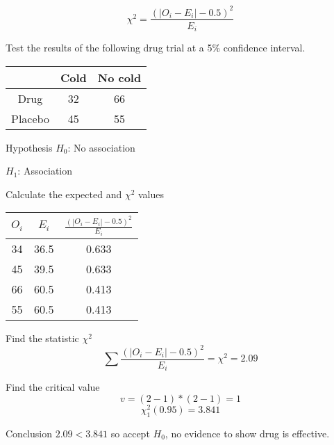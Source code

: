        $$
        \chi^2 = \frac{(|O_i - E_i| - 0.5)^2}{E_i}
        $$
    
        \begin{example}
        {
            Test the results of the following drug trial at a 5\% confidence interval.
            
            \begin{center}
            \begin{tabular}{c|c|c}
                        & Cold  & No cold   \\
                \hline
                Drug    & 32    & 66        \\
                Placebo & 45    & 55        \\
            \end{tabular}
            \end{center}
        }
        
        
        \begin{step}{Hypothesis}
        $H_0$: No association
        
        $H_1$: Association
        \end{step}
        
        \begin{step}{Calculate the expected and $\chi^2$ values}
        \begin{center}
        \begin{tabular}{c|c|c}
            $O_i$ & $E_i$ & $\displaystyle\frac{(|O_i - E_i| - 0.5)^2}{E_i}$    \\[2ex]
            \hline
            \rule{0pt}{3.5ex} 
            34    & 36.5  & 0.633                                               \\[1ex]
            45    & 39.5  & 0.633                                               \\[1ex]
            66    & 60.5  & 0.413                                               \\[1ex]
            55    & 60.5  & 0.413                                               \\[1ex]
        \end{tabular}
        \end{center}
        \end{step}
        
        \begin{step}{Find the statistic $\chi^2$}
        $$\sum{\frac{(|O_i - E_i| - 0.5)^2}{E_i}} = \chi^2 = 2.09$$
        \end{step}
        
        \begin{step}{Find the critical value}
        $$v = (2-1)*(2-1) = 1$$
        $$\chi^2_1(0.95) = 3.841$$
        \end{step}
        
        \begin{step}{Conclusion}
        $2.09 < 3.841$ so accept $H_0$, no evidence to show drug is effective.
        \end{step}
        
        \end{example}

